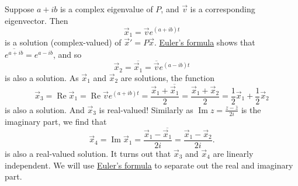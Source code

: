 \documentclass{ximera}
\begin{document}
Suppose $a + ib$ is a complex eigenvalue of $P$, and $\vec{v}$ is a corresponding eigenvector.  Then
\begin{equation*}
    \vec{x}_1 = \vec{v} e^{(a+ib)t}
\end{equation*}
is a solution (complex-valued) of ${\vec{x}}' = P \vec{x}$.  \hyperref[eulersformula]{Euler's formula} shows that $\overline{e^{a+ib}} = e^{a-ib}$, and so
\begin{equation*}
    \vec{x}_2 = \overline{\vec{x}_1} = \overline{\vec{v}} e^{(a-ib)t}
\end{equation*}
is also a solution. As $\vec{x}_1$ and $\vec{x}_2$ are solutions, the function
\begin{equation*}
    \vec{x}_3 = \operatorname{Re} \vec{x}_1 = \operatorname{Re} \vec{v} e^{(a+ib)t} = \frac{\vec{x}_1 + \overline{\vec{x}_1}}{2}  = \frac{\vec{x}_1 + \vec{x}_2}{2}  = \frac{1}{2} \vec{x}_1 + \frac{1}{2}\vec{x}_2
\end{equation*}
is also a solution.  And $\vec{x}_3$ is real-valued!  Similarly as $\operatorname{Im} z = \frac{z-\bar{z}}{2i}$ is the imaginary part, we find that
\begin{equation*}
    \vec{x}_4 = \operatorname{Im} \vec{x}_1 = \frac{\vec{x}_1 - \overline{\vec{x}_1}}{2i}  = \frac{\vec{x}_1 - \vec{x}_2}{2i} .
\end{equation*}
is also a real-valued solution.  It turns out that $\vec{x}_3$ and $\vec{x}_4$ are linearly independent. We will use \hyperref[eulersformula]{Euler's formula} to separate out the real and imaginary part.
\end{document}
